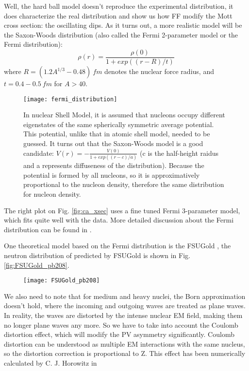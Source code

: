 Well, the hard ball model doesn't reproduce the experimental distribution, it does
characterize the real distribution and show us how FF modify the Mott cross section:
the oscillating dips. As it turns out, a more realistic model will be the
Saxon-Woods distribution (also called the Fermi 2-parameter model or the Fermi
distribution):
\begin{equation}
    \rho(r) = \frac{\rho(0)}{1 + exp((r-R)/t)}
\end{equation}
where $R = (1.2A^{1/3} - 0.48) \ fm$ denotes the nuclear force radius, 
and $t = 0.4-0.5 \ fm$ for  $A > 40$.
\begin{figure}
    \centering
    \texttt{[image: fermi\_distribution]}
    \caption{In nuclear Shell Model, it is assumed that nucleons occupy 
    different eigenstates of the same spherically symmetric average potential.
    This potential, unlike that in atomic shell model, needed to be guessed. 
    It turns out that the Saxon-Woods model is a good candidate: 
    $V(r) = -\frac{V(0)}{1+exp((r-c)/a)}$ (c is the half-height raidus and a represents
    diffuseness of the distribution). Because the potential is formed
    by all nucleons, so it is approximatively proportional to the nucleon density, 
    therefore the same distribution for nucleon density.} 
\end{figure}
The right plot on Fig. \ref{fig:ca_xsec} uses a fine tuned Fermi 3-parameter model,
which fits quite well with the data. More detailed discussion about the Fermi 
distribution can be found in \cite{Maximon:1966sqn}.

One theoretical model based on the Fermi distribution is the FSUGold \cite{PhysRevLett.95.122501},
the neutron distribution of \Pb predicted by FSUGold is shown in Fig. \ref{fig:FSUGold_pb208}.
\begin{figure}[h!]
    \centering
    \texttt{[image: FSUGold\_pb208]}
\end{figure}

We also need to note that for medium and heavy nuclei, the Born approximation
doesn't hold, where the incoming and outgoing waves are treated as plane waves.
In reality, the waves are distorted by the intense nuclear EM field, making them
no longer plane waves any more. So we have to take into account the 
Coulomb distortion effect, which will modify the PV asymmetry significantly.
Coulomb distortion can be understood as multiple EM interactions with
the same nucleus, so the distortion correction is proportional to Z. This effect
has been numerically calculated by C. J. Horowitz in \cite{PhysRevC.57.3430}


